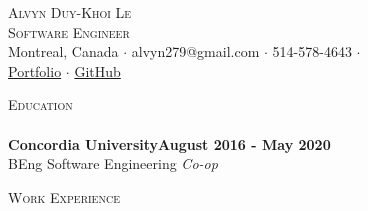 \documentclass[a4paper]{article}
\newcommand{\lineunder} {
    \vspace*{-8pt} \\
    \hspace*{-18pt} \hrulefill \\
}
\newcommand{\header} [1] {
    {\hspace*{-18pt}\vspace*{6pt} \textsc{#1}}
    \vspace*{-6pt} \lineunder
}
\begin{document}
\vspace*{-40pt}

    

\vspace*{-13pt}
\begin{center}
	{\Large \scshape {Alvyn Duy-Khoi Le}}\\
	{\vspace*{3pt}}
	{\large \scshape {Software Engineer}}\\
	{\vspace*{3pt}}
	{\footnotesize Montreal, Canada $\cdot$ alvyn279@gmail.com $\cdot$ 514-578-4643 $\cdot$}\\
	{\footnotesize \href{https://alvynle.me}{Portfolio}  $\cdot$ \href{https://github.com/alvyn279}{GitHub}}\\
\end{center}

\header{Education}
\textbf{Concordia University}\hfill \textbf{August 2016 - May 2020}\\
BEng Software Engineering \textit{Co-op}\\
\vspace{2mm}

\header{Work Experience}
\vspace{1mm}
\end{document}
